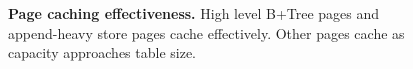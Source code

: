 \begin{figure}
  \centering
  \caption{\textbf{Page caching effectiveness.} High level B+Tree pages and append-heavy store pages cache effectively.  Other pages cache as capacity approaches table size.}
  \label{fig::Caching}
\end{figure}
